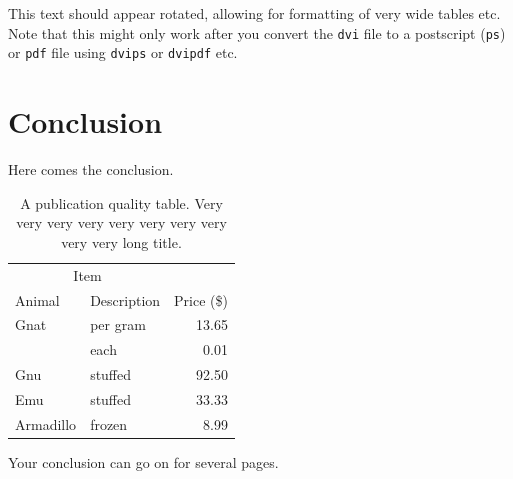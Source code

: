 \documentclass[msc,oneside]{ubcthesis}%
\begin{document}
\begin{landscape}
  This text should appear rotated, allowing for formatting of very
  wide tables etc.  Note that this might only work after you convert
  the \texttt{dvi} file to a postscript (\texttt{ps}) or \texttt{pdf}
  file using \texttt{dvips} or \texttt{dvipdf} etc.
\end{landscape}

\chapter{Conclusion}
Here comes the conclusion.
\begin{table}[tbph]
\centering
\caption{A publication quality table. Very very very very very very very very very very long title.
\label{table:food1}}
\begin{tabular}{@{}llr@{}} \toprule 
\multicolumn{2}{c}{Item} \\ \cmidrule(r){1-2} 
Animal & Description & Price (\$)\\ \midrule 
Gnat & per gram & 13.65 \\ 
& each & 0.01 \\ 
Gnu & stuffed & 92.50 \\ 
Emu & stuffed & 33.33 \\ 
Armadillo & frozen & 8.99 \\ \bottomrule 
\end{tabular}
\end{table}

\newpage
Your conclusion can go on for several pages.




\end{document}
